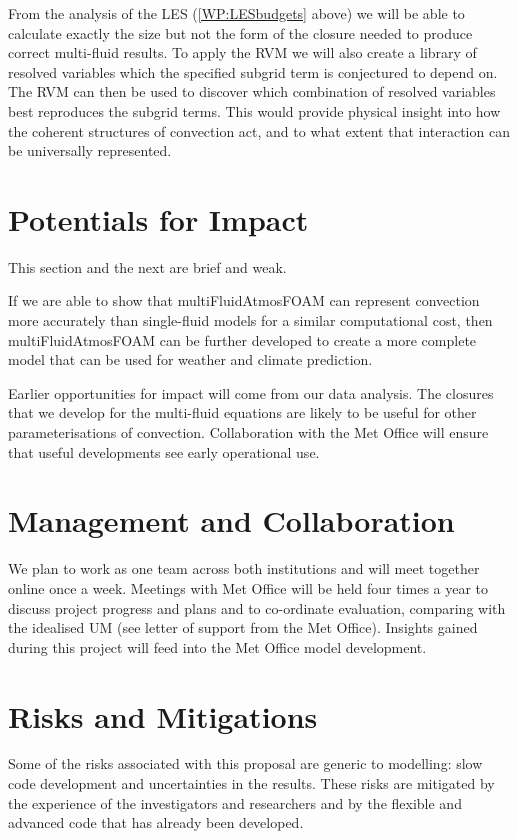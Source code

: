 \documentclass[11pt,a4paper]{article}
\begin{document}
From the analysis of the LES (\ref{WP:LESbudgets} above) we will be able to calculate exactly the size but not the form of the closure needed to produce correct multi-fluid results. To apply the RVM we will also create a library of resolved variables which the specified subgrid term is conjectured to depend on. The RVM can then be used to discover which combination of resolved variables best reproduces the subgrid terms. This would provide physical insight into how the coherent structures of convection act, and to what extent that interaction can be universally represented.

\section{Potentials for Impact}

{\color{red} This section and the next are brief and weak.}

If we are able to show that multiFluidAtmosFOAM can represent convection more accurately than single-fluid models for a similar computational cost, then multiFluidAtmosFOAM can be further developed to create a more complete model that can be used for weather and climate prediction.

Earlier opportunities for impact will come from our data analysis. The closures that we develop for the multi-fluid equations are likely to be useful for other parameterisations of convection. Collaboration with the Met Office will ensure that useful developments see early operational use. 

\section{Management and Collaboration}

We plan to work as one team across both institutions and will meet together online once a week. Meetings with Met Office will be held four times a year to discuss project progress and plans and to co-ordinate evaluation, comparing with the idealised UM (see letter of support from the Met Office). Insights gained during this project will feed into the Met Office model development.

\section{Risks and Mitigations}

Some of the risks associated with this proposal are generic to modelling: slow code development and uncertainties in the results. These risks are mitigated by the experience of the investigators and researchers and by the flexible and advanced code that has already been developed.
\end{document}
